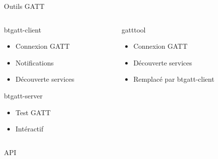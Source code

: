\begin{frame}
\begin{center}\huge Outils GATT\end{center}
	\begin{columns}[t]
		\begin{column}{0.50\linewidth}
			\begin{block}{btgatt-client}
				\begin{itemize}
					\item Connexion GATT
					\item Notifications
					\item Découverte services
				\end{itemize}
			\end{block}
			\begin{block}{btgatt-server}
				\begin{itemize}
					\item Test GATT
					\item Intéractif
				\end{itemize}
			\end{block}
		\end{column}
		\begin{column}{0.50\linewidth}
			\begin{block}{gatttool}
				\begin{itemize}
					\item Connexion GATT
					\item Découverte services
					\item Remplacé par btgatt-client
				\end{itemize}
			\end{block}
		\end{column}
	\end{columns}
\end{frame}


\begin{frame}
API
\end{frame}


